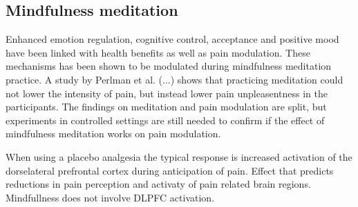 \subsection{Mindfulness meditation}
Enhanced emotion regulation, cognitive control, acceptance and positive mood have been linked with health benefits as well as pain modulation. These mechanisms has been shown to be modulated during mindfulness meditation practice.
A study by Perlman et al. (...) shows that practicing meditation could not lower the intensity of pain, but instead lower pain unpleasentness in the participants. The findings on meditation and pain modulation are split, but experiments in controlled settings are still needed to confirm if the effect of mindfulness meditation works on pain modulation. \cite{Zeidan2012}

When using a placebo analgesia the typical response is increased activation of the dorselateral prefrontal cortex during anticipation of pain. Effect that predicts reductions in pain perception and activaty of pain related brain regions. Mindfullness does not involve DLPFC activation. 